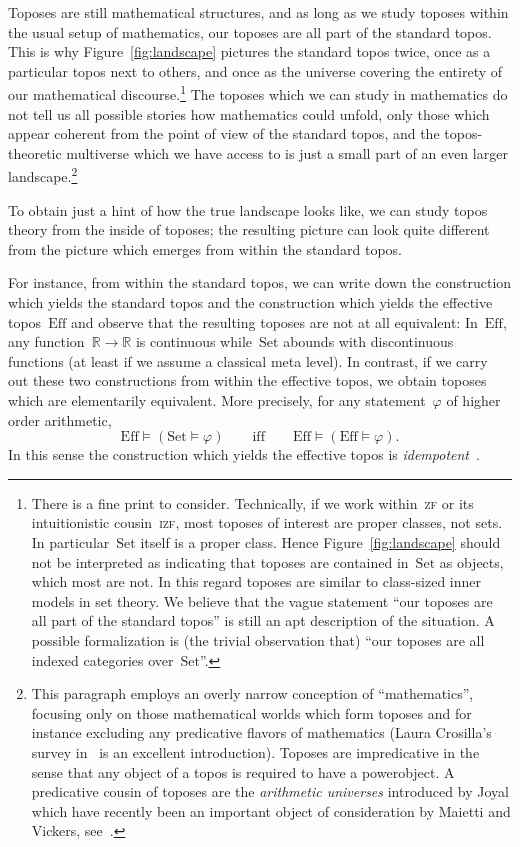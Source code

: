\documentclass[graybox]{svmult}
\newcommand{\RR}{\mathbb{R}}
\newcommand{\Set}{\mathrm{Set}}
\newcommand{\Eff}{\mathrm{Ef{}f}}
\renewcommand{\_}{\mathpunct{.}\,}
\newcommand{\effective}{ef{}fective\xspace}
\newcommand{\?}{\,{:}\,}
\begin{document}
Toposes are still mathematical structures, and as long as we study
toposes within the usual setup of mathematics, our toposes are all part of the
standard topos. This is why Figure~\ref{fig:landscape} pictures the standard
topos twice, once as a particular topos next to others, and once as the universe
covering the entirety of our mathematical discourse.\footnote{There is a fine print to consider. Technically, if we
work within~\textsc{zf} or its intuitionistic cousin~\textsc{izf}, most toposes
of interest are proper classes, not sets. In particular~$\Set$ itself is a
proper class. Hence Figure~\ref{fig:landscape} should not be interpreted as
indicating that toposes are contained in~$\Set$ as objects, which most are not.
In this regard toposes are similar to class-sized inner models in set theory.
We believe that the vague statement ``our toposes are all part of the standard topos'' is still an
apt description of the situation. A possible formalization is (the trivial
observation that) ``our toposes are all indexed categories over~$\Set$''.}
The toposes which we can study in mathematics do not tell us
all possible stories how mathematics could unfold, only those which appear
coherent from the point of view of the standard topos, and the topos-theoretic
multiverse which we have access to is just a small part of an even larger
landscape.\footnote{This paragraph employs an overly narrow conception of
``mathematics'', focusing only on those mathematical worlds which form toposes
and for instance excluding any predicative flavors of mathematics
(Laura Crosilla's survey in~\cite{crosilla:predicativity} is an excellent introduction).
Toposes are impredicative in the sense that any object of a topos is required to have a
powerobject. A predicative cousin of toposes are the \emph{arithmetic
universes} introduced by Joyal which have recently been an important object of
consideration by Maietti and
Vickers, see~\cite{maietti:au,maietti-vickers:induction,vickers:sketches}.}

To obtain just a hint of how the true landscape looks like, we can study topos
theory from the inside of toposes; the resulting picture can look quite
different from the picture which emerges from within the standard topos.

For instance, from within the standard topos, we can write down the
construction which yields the standard topos and the construction which yields
the \effective topos~$\Eff$ and observe that the resulting toposes are not at
all equivalent: In~$\Eff$, any function~$\RR \to \RR$ is continuous
while~$\Set$ abounds with discontinuous functions (at least if we assume a
classical meta level). In contrast, if we carry out these two constructions
from within the \effective topos, we obtain toposes which are elementarily
equivalent. More precisely, for any statement~$\varphi$ of higher order
arithmetic,
\[ \Eff \models (\Set \models \varphi) \qquad\text{iff}\qquad\Eff \models
  (\Eff \models \varphi). \]
In this sense the construction which yields the \effective topos is
\emph{idempotent}~\cite[Section~3.8.3]{oosten:realizability}.
\end{document}
